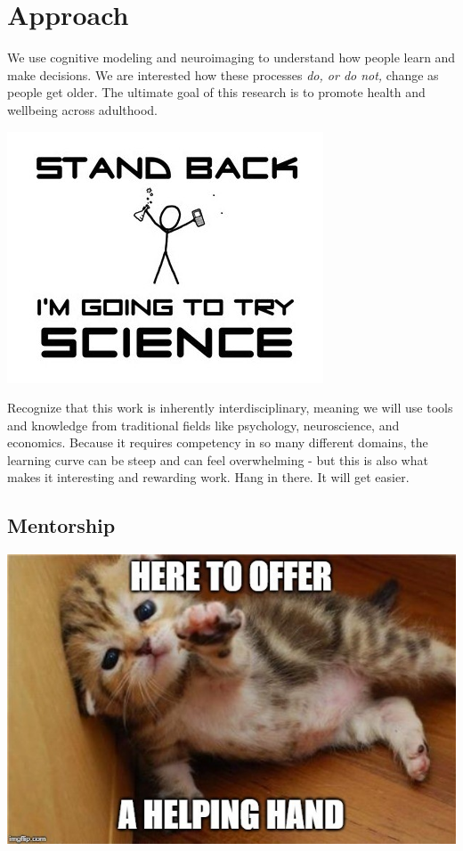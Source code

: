 \documentclass[
]{book}
\begin{document}
\hypertarget{approach}{%
\chapter{Approach}\label{approach}}

We use cognitive modeling and neuroimaging to understand how people learn and make decisions. We are interested how these processes \emph{do, or do not,} change as people get older. The ultimate goal of this research is to promote health and wellbeing across adulthood.

\includegraphics{images/xkcd_science.png}

Recognize that this work is inherently interdisciplinary, meaning we will use tools and knowledge from traditional fields like psychology, neuroscience, and economics. Because it requires competency in so many different domains, the learning curve can be steep and can feel overwhelming - but this is also what makes it interesting and rewarding work. Hang in there. It will get easier.

\hypertarget{mentorship}{%
\section{Mentorship}\label{mentorship}}

\includegraphics{images/help.jpeg}
\end{document}
